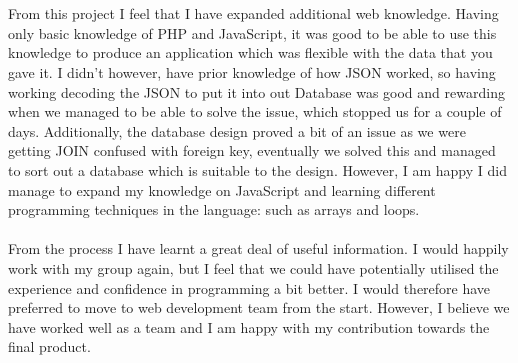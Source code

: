 \documentclass[12pt]{article}
\begin{document}
~\\\\
From this project I feel that I have expanded additional web knowledge. Having only basic knowledge of PHP and JavaScript, it was good to be able to use this knowledge to produce an application which was flexible with the data that you gave it. I didn't however, have prior knowledge of how JSON worked, so having working decoding the JSON to put it into out Database was good and rewarding when we managed to be able to solve the issue, which stopped us for a couple of days. Additionally, the database design proved a bit of an issue as we were getting JOIN confused with foreign key, eventually we solved this and managed to sort out a database which is suitable to the design. However, I am happy I did manage to expand my knowledge on JavaScript and learning different programming techniques in the language: such as arrays and loops.
~\\\\
From the process I have learnt a great deal of useful information. I would happily work with my group again, but I feel that we could have potentially utilised the experience and confidence in programming a bit better. I would therefore have preferred to move to web development team from the start. However, I believe we have worked well as a team and I am happy with my contribution towards the final product.
\end{document}
